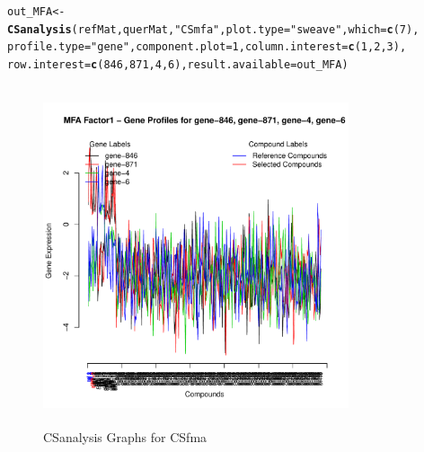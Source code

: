 \documentclass[a4paper]{article}\usepackage[]{graphicx}\usepackage[]{color}
\makeatletter
\newcommand{\hlnum}[1]{\textcolor[rgb]{0.686,0.059,0.569}{#1}}%
\newcommand{\hlstr}[1]{\textcolor[rgb]{0.192,0.494,0.8}{#1}}%
\newcommand{\hlstd}[1]{\textcolor[rgb]{0.345,0.345,0.345}{#1}}%
\newcommand{\hlkwb}[1]{\textcolor[rgb]{0.69,0.353,0.396}{#1}}%
\newcommand{\hlkwc}[1]{\textcolor[rgb]{0.333,0.667,0.333}{#1}}%
\newcommand{\hlkwd}[1]{\textcolor[rgb]{0.737,0.353,0.396}{\textbf{#1}}}%
\newenvironment{kframe}{%
 \def\at@end@of@kframe{}%
 \ifinner\ifhmode%
  \def\at@end@of@kframe{\end{minipage}}%
  \begin{minipage}{\columnwidth}%
 \fi\fi%
 \def\FrameCommand##1{\hskip\@totalleftmargin \hskip-\fboxsep
 \colorbox{shadecolor}{##1}\hskip-\fboxsep
     \hskip-\linewidth \hskip-\@totalleftmargin \hskip\columnwidth}%
 \MakeFramed {\advance\hsize-\width
   \@totalleftmargin\z@ \linewidth\hsize
   \@setminipage}}%
 {\par\unskip\endMakeFramed%
 \at@end@of@kframe}
\newenvironment{knitrout}{}{} %
\makeatother
\begin{document}
\begin{knitrout}
\color{fgcolor}\begin{kframe}
\begin{alltt}
        \hlstd{out_MFA} \hlkwb{<-} \hlkwd{CSanalysis}\hlstd{(refMat,querMat,}\hlstr{"CSmfa"}\hlstd{,}\hlkwc{plot.type}\hlstd{=}\hlstr{"sweave"}\hlstd{,}\hlkwc{which}\hlstd{=}\hlkwd{c}\hlstd{(}\hlnum{7}\hlstd{),}
                        \hlkwc{profile.type}\hlstd{=}\hlstr{"gene"}\hlstd{,}\hlkwc{component.plot}\hlstd{=}\hlnum{1}\hlstd{,}\hlkwc{column.interest}\hlstd{=}\hlkwd{c}\hlstd{(}\hlnum{1}\hlstd{,}\hlnum{2}\hlstd{,}\hlnum{3}\hlstd{),}
                        \hlkwc{row.interest}\hlstd{=}\hlkwd{c}\hlstd{(}\hlnum{846}\hlstd{,}\hlnum{871}\hlstd{,}\hlnum{4}\hlstd{,}\hlnum{6}\hlstd{),}\hlkwc{result.available}\hlstd{=out_MFA)}
\end{alltt}
\end{kframe}\begin{figure}[H]


\includegraphics[width=9cm,height=10cm]{figure/MFA3-1} \hfill{}

\caption[CSanalysis Graphs for CSfma]{CSanalysis Graphs for CSfma\label{fig:MFA3}}
\end{figure}


\end{knitrout}
\end{document}
